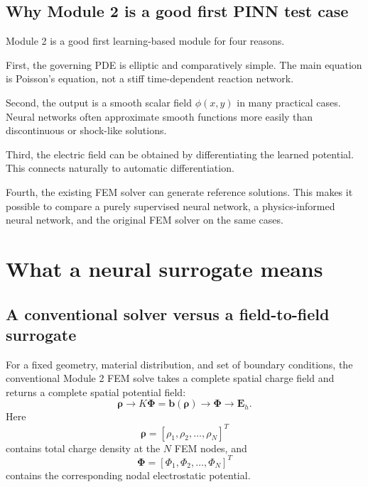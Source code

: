 \documentclass[11pt]{article}
\newcommand{\Evec}{\mathbf{E}}
\begin{document}
\subsection{Why Module 2 is a good first PINN test case}

Module 2 is a good first learning-based module for four reasons.

First, the governing PDE is elliptic and comparatively simple. The main equation is Poisson's equation, not a stiff time-dependent reaction network.

Second, the output is a smooth scalar field $\phi(x,y)$ in many practical cases. Neural networks often approximate smooth functions more easily than discontinuous or shock-like solutions.

Third, the electric field can be obtained by differentiating the learned potential. This connects naturally to automatic differentiation.

Fourth, the existing FEM solver can generate reference solutions. This makes it possible to compare a purely supervised neural network, a physics-informed neural network, and the original FEM solver on the same cases.

\section{What a neural surrogate means}

\subsection{A conventional solver versus a field-to-field surrogate}

For a fixed geometry, material distribution, and set of boundary conditions, the conventional Module 2 FEM solve takes a complete spatial charge field and returns a complete spatial potential field:
\begin{equation}
\bm{\rho}
\longrightarrow
K\bm{\Phi}=\bm{b}(\bm{\rho})
\longrightarrow
\bm{\Phi}
\longrightarrow
\Evec_h.
\label{eq:fem_field_mapping}
\end{equation}
Here
\begin{equation}
\bm{\rho}=\left[\rho_1,\rho_2,\ldots,\rho_N\right]^T
\end{equation}
contains total charge density at the $N$ FEM nodes, and
\begin{equation}
\bm{\Phi}=\left[\Phi_1,\Phi_2,\ldots,\Phi_N\right]^T
\end{equation}
contains the corresponding nodal electrostatic potential.
\end{document}
